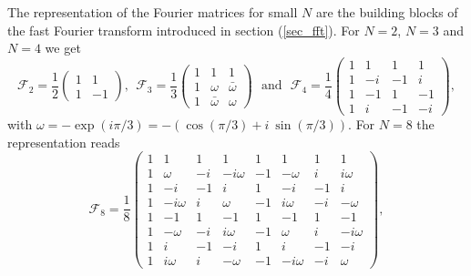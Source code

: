 The representation of the Fourier matrices for small $N$ are the building 
blocks of the fast Fourier transform introduced in section (\ref{sec_fft}).   
For $N = 2$, $N = 3$ and $N = 4$ we get
\begin{equation} \label{eq_F2F3F4}
 \mathcal{F}_{2}
  =
 \frac{1}{2}
 \left(
  \begin{array}{cr}
     1  &  1 
        \\
     1  &  -1 
  \end{array}
 \right),
 \ \ 
 \mathcal{F}_{3}
  =
 \frac{1}{3}
 \left(
  \begin{array}{ccc}
     1    &    1         &    1
              \\
     1    & \omega       &  \bar{\omega}
              \\
     1    & \bar{\omega} &  \omega 
  \end{array}
 \right)
\ \ \ \mbox{and} \ \ \ 
 \mathcal{F}_{4}
  =
 \frac{1}{4}
 \left(
  \begin{array}{crrr}
   1   & 1   &  1  &  1
        \\
   1   & -i  & -1  &  i
        \\
   1   & -1  &  1  & -1
        \\
   1   &  i  & -1  & -i 
  \end{array}
 \right),
\end{equation}
with $\omega = -\exp (i \pi/3)=-(\cos(\pi/3)+i \ \sin(\pi/3))$. For $N=8$ 
the representation reads     
\begin{equation} \label{eq_F8}
 \mathcal{F}_{8}
  =
 \frac{1}{8}
 \left(
  \begin{array}{crrrrrrr}
   1 & 1        &  1 &  1       &  1 & 1        &  1 & 1
                                           \\
   1 & \omega   & -i & -i\omega & -1 & -\omega  &  i & i\omega 
                                           \\
   1 & -i       & -1 &  i       &  1 & -i       & -1 & i
                                           \\ 
   1 & -i\omega &  i &  \omega  & -1 & i\omega  & -i & -\omega
                                           \\  
   1 & -1       &  1 & -1       &  1 & -1       &  1 & -1
                                           \\ 
   1 & -\omega  & -i &  i\omega & -1 & \omega   &  i & -i\omega 
                                           \\ 
   1 & i        & -1 & -i       &  1 & i        & -1 & -i 
                                           \\ 
   1 & i\omega  &  i & -\omega  & -1 & -i\omega & -i & \omega 
  \end{array}
 \right),
\end{equation}
